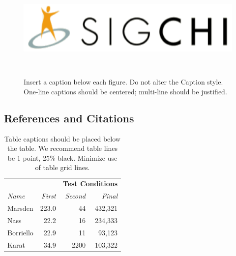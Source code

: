 \documentclass{sigchi}
\begin{document}
\begin{figure} \centering
\includegraphics[width=0.9\columnwidth]{figures/sigchi-logo} \caption{Insert a
caption below each figure. Do not alter the Caption style.  One-line captions
should be centered; multi-line should be justified. }~\label{fig:figure1}
\end{figure}

\subsection{References and Citations}





\begin{table} \centering \begin{tabular}{l r r r}
    & & \multicolumn{2}{c}{\small{\textbf{Test Conditions}}} \\
    \cmidrule(r){3-4} {\small\textit{Name}} & {\small \textit{First}} & {\small
    \textit{Second}} & {\small \textit{Final}} \\ \midrule Marsden & 223.0 & 44
    & 432,321 \\ Nass & 22.2 & 16 & 234,333 \\ Borriello & 22.9 & 11 & 93,123 \\
    Karat & 34.9 & 2200 & 103,322 \\
  \end{tabular} \caption{Table captions should be placed below the table. We
  recommend table lines be 1 point, 25\% black. Minimize use of table grid
  lines.}~\label{tab:table1} \end{table}
\end{document}
